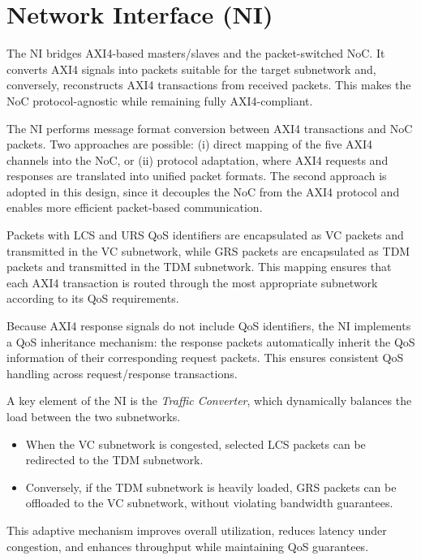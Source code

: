\section{Network Interface (NI)}

The NI bridges AXI4-based masters/slaves and the packet-switched NoC. It converts AXI4 signals into packets suitable for the target subnetwork and, conversely, reconstructs AXI4 transactions from received packets. This makes the NoC protocol-agnostic while remaining fully AXI4-compliant.

The NI performs message format conversion between AXI4 transactions and NoC packets. 
Two approaches are possible: 
(i) direct mapping of the five AXI4 channels into the NoC, or 
(ii) protocol adaptation, where AXI4 requests and responses are translated into unified packet formats. 
The second approach is adopted in this design, since it decouples the NoC from the AXI4 protocol and enables more efficient packet-based communication. 

Packets with LCS and URS QoS identifiers are encapsulated as VC packets and transmitted in the VC subnetwork, while GRS packets are encapsulated as TDM packets and transmitted in the TDM subnetwork. 
This mapping ensures that each AXI4 transaction is routed through the most appropriate subnetwork according to its QoS requirements.

Because AXI4 response signals do not include QoS identifiers, the NI implements a QoS inheritance mechanism: the response packets automatically inherit the QoS information of their corresponding request packets. This ensures consistent QoS handling across request/response transactions.

A key element of the NI is the \textit{Traffic Converter}, which dynamically balances the load between the two subnetworks. 
\begin{itemize}
    \item When the VC subnetwork is congested, selected LCS packets can be redirected to the TDM subnetwork.
    \item Conversely, if the TDM subnetwork is heavily loaded, GRS packets can be offloaded to the VC subnetwork, without violating bandwidth guarantees.
\end{itemize}
This adaptive mechanism improves overall utilization, reduces latency under congestion, and enhances throughput while maintaining QoS guarantees.
